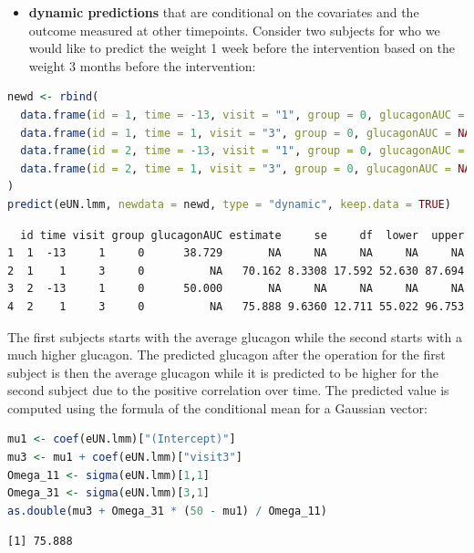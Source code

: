 \documentclass[12pt]{article}
\begin{document}
\clearpage

\begin{itemize}
\item \textbf{dynamic predictions} that are conditional on the covariates and the
outcome measured at other timepoints. Consider two subjects for who
we would like to predict the weight 1 week before the intervention
based on the weight 3 months before the intervention:
\end{itemize}

\begin{lstlisting}[language=r,numbers=none,otherkeywords={}, deletekeywords={}]
newd <- rbind(
  data.frame(id = 1, time = -13, visit = "1", group = 0, glucagonAUC = coef(eUN.lmm)["(Intercept)"]),
  data.frame(id = 1, time = 1, visit = "3", group = 0, glucagonAUC = NA),
  data.frame(id = 2, time = -13, visit = "1", group = 0, glucagonAUC = 50),
  data.frame(id = 2, time = 1, visit = "3", group = 0, glucagonAUC = NA)
)
predict(eUN.lmm, newdata = newd, type = "dynamic", keep.data = TRUE)
\end{lstlisting}

\label{}
\begin{verbatim}
  id time visit group glucagonAUC estimate     se     df  lower  upper
1  1  -13     1     0      38.729       NA     NA     NA     NA     NA
2  1    1     3     0          NA   70.162 8.3308 17.592 52.630 87.694
3  2  -13     1     0      50.000       NA     NA     NA     NA     NA
4  2    1     3     0          NA   75.888 9.6360 12.711 55.022 96.753
\end{verbatim}


The first subjects starts with the average glucagon while the second
  starts with a much higher glucagon. The predicted glucagon after the
  operation for the first subject is then the average glucagon while
  it is predicted to be higher for the second subject due to the
  positive correlation over time. The predicted value is computed
  using the formula of the conditional mean for a Gaussian vector:
\begin{lstlisting}[language=r,numbers=none]
mu1 <- coef(eUN.lmm)["(Intercept)"]
mu3 <- mu1 + coef(eUN.lmm)["visit3"]
Omega_11 <- sigma(eUN.lmm)[1,1]
Omega_31 <- sigma(eUN.lmm)[3,1]
as.double(mu3 + Omega_31 * (50 - mu1) / Omega_11)
\end{lstlisting}

\label{}
\begin{verbatim}
[1] 75.888
\end{verbatim}
\end{document}
